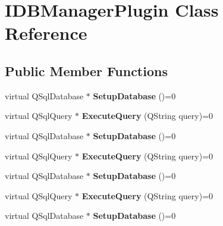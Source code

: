 \hypertarget{class_i_d_b_manager_plugin}{}\section{I\+D\+B\+Manager\+Plugin Class Reference}
\label{class_i_d_b_manager_plugin}
\subsection*{Public Member Functions}
\begin{DoxyCompactItemize}
\item 
\mbox{\label{class_i_d_b_manager_plugin_add096dcc73790ff4230a44816090d989}} 
virtual Q\+Sql\+Database $\ast$ {\bfseries Setup\+Database} ()=0
\item 
\mbox{\label{class_i_d_b_manager_plugin_acc0927a1751a2f1d0d87b9b324db17e7}} 
virtual Q\+Sql\+Query $\ast$ {\bfseries Execute\+Query} (Q\+String query)=0
\item 
\mbox{\label{class_i_d_b_manager_plugin_add096dcc73790ff4230a44816090d989}} 
virtual Q\+Sql\+Database $\ast$ {\bfseries Setup\+Database} ()=0
\item 
\mbox{\label{class_i_d_b_manager_plugin_acc0927a1751a2f1d0d87b9b324db17e7}} 
virtual Q\+Sql\+Query $\ast$ {\bfseries Execute\+Query} (Q\+String query)=0
\item 
\mbox{\label{class_i_d_b_manager_plugin_add096dcc73790ff4230a44816090d989}} 
virtual Q\+Sql\+Database $\ast$ {\bfseries Setup\+Database} ()=0
\item 
\mbox{\label{class_i_d_b_manager_plugin_acc0927a1751a2f1d0d87b9b324db17e7}} 
virtual Q\+Sql\+Query $\ast$ {\bfseries Execute\+Query} (Q\+String query)=0
\item 
\mbox{\label{class_i_d_b_manager_plugin_add096dcc73790ff4230a44816090d989}} 
virtual Q\+Sql\+Database $\ast$ {\bfseries Setup\+Database} ()=0
\item 
\mbox{\label{class_i_d_b_manager_plugin_acc0927a1751a2f1d0d87b9b324db17e7}} 

\end{DoxyCompactItemize}
